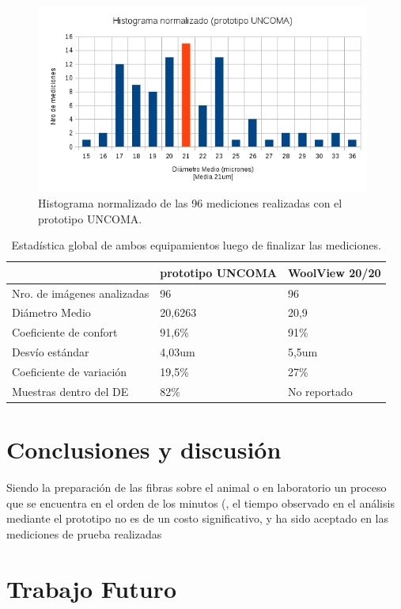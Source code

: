 \documentclass[runningheads,a4paper]{llncs}
\begin{document}
\begin{figure}
\centering
\includegraphics[height=6.2cm]{histograma}
\caption{Histograma normalizado de las 96 mediciones realizadas con el prototipo UNCOMA.}
\label{fig:histograma}
\end{figure}

\begin{table}[htbp]
\begin{center}
\begin{tabular}{|l|l|l|}
\hline
& prototipo UNCOMA & WoolView 20/20 \\
\hline \hline \hline
Nro. de imágenes analizadas & 96 & 96 \\ \hline
Diámetro Medio & 20,6263 & 20,9 \\ \hline
Coeficiente de confort & 91,6\% & 91\% \\ \hline
Desvío estándar & 4,03um & 5,5um \\ \hline
Coeficiente de variación & 19,5\% & 27\% \\ \hline
Muestras dentro del DE & 82\% & No reportado \\ \hline
\end{tabular}
\caption{Estadística global de ambos equipamientos luego de finalizar las mediciones.}
\label{tabla:sencilla}
\end{center}
\end{table}


\section{Conclusiones y discusión}
Siendo la preparación de las fibras sobre el animal o en laboratorio un proceso que se encuentra en el orden de los minutos (, el tiempo observado en el análisis mediante el prototipo no es de un costo significativo, y ha sido aceptado  en las mediciones de prueba realizadas 

\section{Trabajo Futuro}
\end{document}
